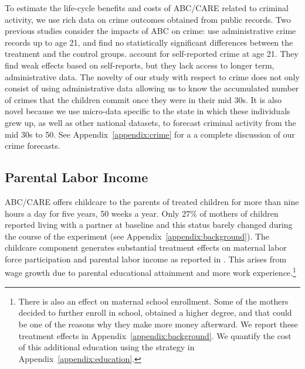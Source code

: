 To estimate the life-cycle benefits and costs of ABC/CARE related to criminal activity, we use rich data on crime outcomes obtained from public records. Two previous studies consider the impacts of ABC on crime: \citet{Clarke_Campbell_1998_ABC_Comparison_ECRQ} use administrative crime records up to age 21, and find no statistically significant differences between the treatment and the control groups. \cite{Barnett_Masse_2002_benefitcost,Barnett_Masse_2007_EER} account for self-reported crime at age 21. They find weak effects based on self-reports, but they lack access to longer term, administrative data. The novelty of our study with respect to crime does not only consist of using administrative data allowing us to know the accumulated number of crimes that the children commit once they were in their mid 30s. It is also novel because we use micro-data specific to the state in which these individuals grew up, as well as other national datasets, to forecast criminal activity from the mid 30s to 50. See Appendix~\ref{appendix:crime} for a a complete discussion of our crime forecasts.

\subsection{Parental Labor Income} \label{section:pincome}

ABC/CARE offers childcare to the parents of treated children for more than nine hours a day for five years, 50 weeks a year. Only $27\%$ of mothers of children reported living with a partner at baseline and this status barely changed during the course of the experiment (see Appendix~\ref{appendix:background}). The childcare component generates substantial treatment effects on maternal labor force participation and parental labor income as reported in \cite{Garcia_Heckman_Ziff_2017_Gender-Diff_UNPUBLISHED}. This arises from wage growth due to parental educational attainment and more work experience.\footnote{There is also an effect on maternal school enrollment. Some of the mothers decided to further enroll in school, obtained a higher degree, and that could be one of the reasons why they make more money afterward. We report these treatment effects in Appendix~\ref{appendix:background}. We quantify the cost of this additional education using the strategy in Appendix~\ref{appendix:education}.}\\

